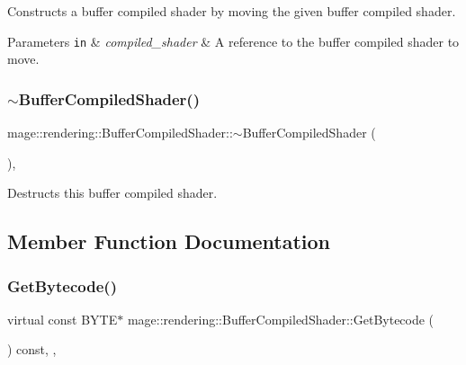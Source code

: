 Constructs a buffer compiled shader by moving the given buffer compiled shader.


\begin{DoxyParams}[1]{Parameters}
\mbox{\tt in}  & {\em compiled\+\_\+shader} & A reference to the buffer compiled shader to move. \\
\hline
\end{DoxyParams}
\hypertarget{classmage_1_1rendering_1_1_buffer_compiled_shader_af989fa0356f17de9dd75b76aace3f106}{}\label{classmage_1_1rendering_1_1_buffer_compiled_shader_af989fa0356f17de9dd75b76aace3f106} 
\subsubsection{\texorpdfstring{$\sim$\+Buffer\+Compiled\+Shader()}{~BufferCompiledShader()}}
{\footnotesize\ttfamily mage\+::rendering\+::\+Buffer\+Compiled\+Shader\+::$\sim$\+Buffer\+Compiled\+Shader (\begin{DoxyParamCaption}{ }\end{DoxyParamCaption})\hspace{0.3cm}{\ttfamily [virtual]}, {\ttfamily [default]}}

Destructs this buffer compiled shader. 

\subsection{Member Function Documentation}
\hypertarget{classmage_1_1rendering_1_1_buffer_compiled_shader_a0887622bd25db8698c572d0dc46167b9}{}\label{classmage_1_1rendering_1_1_buffer_compiled_shader_a0887622bd25db8698c572d0dc46167b9} 
\subsubsection{\texorpdfstring{Get\+Bytecode()}{GetBytecode()}}
{\footnotesize\ttfamily virtual const B\+Y\+TE$\ast$ mage\+::rendering\+::\+Buffer\+Compiled\+Shader\+::\+Get\+Bytecode (\begin{DoxyParamCaption}{ }\end{DoxyParamCaption}) const\hspace{0.3cm}{\ttfamily [override]}, {\ttfamily [virtual]}, {\ttfamily [noexcept]}}

